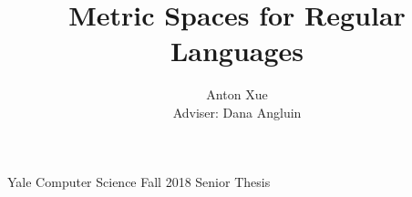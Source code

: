 \documentclass[12pt]{article}
\title{Metric Spaces for Regular Languages}
\author{Anton Xue \\
  Adviser: Dana Angluin
}
\date{}
\begin{document}
\maketitle

\begin{center}
  Yale Computer Science Fall 2018 Senior Thesis
\end{center}

\newpage

\tableofcontents

\newpage




















\newpage

\printbibliography


\end{document}

